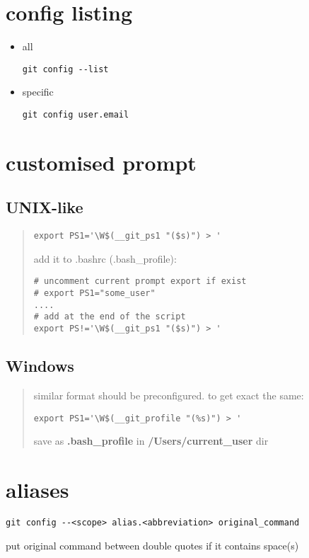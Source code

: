 \documentclass{report}
\begin{document}
\section{config listing}
\begin{itemize}
\item all
\begin{lstlisting}
git config --list
\end{lstlisting}

\item specific
\begin{lstlisting}
git config user.email
\end{lstlisting}
\end{itemize}

\section{customised prompt}
\subsection*{UNIX-like}
\begin{quote}
\begin{verbatim}
export PS1='\W$(__git_ps1 "($s)") > '
\end{verbatim}
add it to .bashrc (.bash\_profile):
\begin{lstlisting}
# uncomment current prompt export if exist
# export PS1="some_user"
....
# add at the end of the script
export PS!='\W$(__git_ps1 "($s)") > '

\end{lstlisting}
\end{quote}

\subsection*{Windows}
\begin{quote}
similar format should be preconfigured. to get exact the same:
\begin{verbatim}
export PS1='\W$(__git_profile "(%s)") > '
\end{verbatim}
save as \textbf{.bash\_profile} in \textbf{/Users/current\_user} dir
\end{quote}

\section{aliases}
\begin{verbatim}
git config --<scope> alias.<abbreviation> original_command
\end{verbatim}
put original command between double quotes if it contains space(s)
\end{document}
